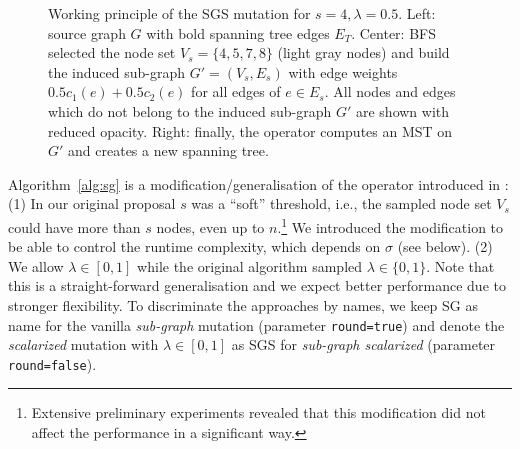 \documentclass[twoside]{article}
\begin{document}
\begin{figure}[htbp]
\begin{minipage}[c]{0.33\columnwidth}
  \end{minipage}
  \caption{Working principle of the SGS mutation for $s = 4, \lambda = 0.5$. Left: source graph $G$ with bold spanning tree edges $E_T$. Center: BFS selected the node set $V_s = \{4, 5, 7, 8\}$ (light gray nodes) and build the induced sub-graph $G'=(V_s, E_s)$ with edge weights $0.5c_1(e) + 0.5c_2(e)$ for all edges of $e \in E_s$. All nodes and edges which do not belong to the induced sub-graph $G'$ are shown with reduced opacity. Right: finally, the operator computes an MST on $G'$ and creates a new spanning tree.}
  \label{fig:sg_detailed}
\end{figure}
Algorithm~\ref{alg:sg} is a modification/generalisation of the operator introduced in \citet{BG2017ParetoBeneficial}: (1) In our original proposal $s$ was a \enquote{soft} threshold, i.e., the sampled node set $V_s$ could have more than $s$ nodes, even up to $n$.\footnote{Extensive preliminary experiments revealed that this modification did not affect the performance in a significant way.} We introduced the modification to be able to control the runtime complexity, which depends on $\sigma$ (see below). (2) We allow $\lambda \in [0,1]$ while the original algorithm sampled $\lambda \in \{0, 1\}$. Note that this is a straight-forward generalisation and we expect better performance due to stronger flexibility. To discriminate the approaches by names, we keep SG as name for the vanilla \emph{sub-graph} mutation (parameter \verb|round=true|) and denote the \emph{scalarized} mutation with $\lambda \in [0,1]$ as SGS for \emph{sub-graph scalarized} (parameter \verb|round=false|).

\end{document}
